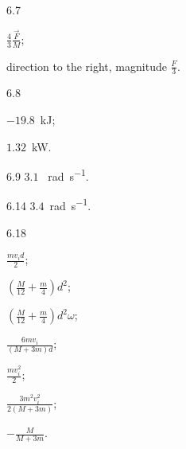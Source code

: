 \begin{Solution}{6.{7}}
		\begin{enumerate*}[label=(\alph*)]
			\item $\frac43 \frac{\vec F}{M}$;
			\item direction to the right, magnitude $\frac{F}{3}$.
		\end{enumerate*}
	
\end{Solution}
\begin{Solution}{6.{8}}
		\begin{enumerate*}[label=(\alph*)]
			\item $-19.8$~kJ;
			\item $1.32$~kW.
		\end{enumerate*}
	
\end{Solution}
\begin{Solution}{6.{9}}
		$3.1$	~\si{\radian\per\second}.
	
\end{Solution}
\begin{Solution}{6.{14}}
		$3.4$~\si{\radian\per\second}.
	
\end{Solution}
\begin{Solution}{6.{18}}
		\begin{enumerate*}[label=(\alph*)]
			\item $\frac{mv_id}{2}$;
			\item $\left( \frac{M}{12} + \frac{m}{4}\right) d^2$;
			\item $\left( \frac{M}{12} + \frac{m}{4}\right) d^2\omega$;
			\item $\frac{6mv_i}{(M + 3m)d}$;
			\item $\frac{mv_i^2}{2}$;
			\item $\frac{3m^2v_i^2}{2(M + 3m)}$;
			\item $-\frac{M}{M + 3m}$.
		\end{enumerate*}
	
\end{Solution}
